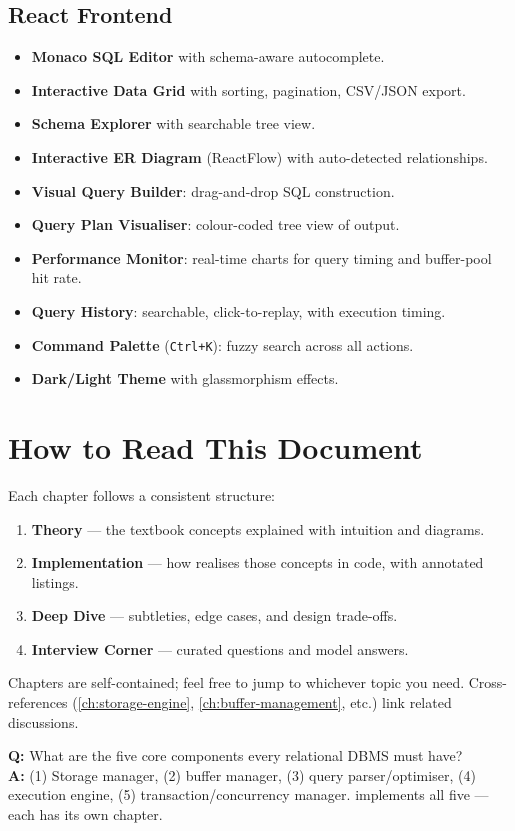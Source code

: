 \subsection{React Frontend}
\begin{itemize}[nosep]
  \item \textbf{Monaco SQL Editor} with schema-aware autocomplete.
  \item \textbf{Interactive Data Grid} with sorting, pagination, CSV/JSON export.
  \item \textbf{Schema Explorer} with searchable tree view.
  \item \textbf{Interactive ER Diagram} (ReactFlow) with auto-detected relationships.
  \item \textbf{Visual Query Builder}: drag-and-drop SQL construction.
  \item \textbf{Query Plan Visualiser}: colour-coded tree view of  output.
  \item \textbf{Performance Monitor}: real-time charts for query timing and buffer-pool hit rate.
  \item \textbf{Query History}: searchable, click-to-replay, with execution timing.
  \item \textbf{Command Palette} (\texttt{Ctrl+K}): fuzzy search across all actions.
  \item \textbf{Dark/Light Theme} with glassmorphism effects.
\end{itemize}

\section{How to Read This Document}

Each chapter follows a consistent structure:
\begin{enumerate}[nosep]
  \item \textbf{Theory} --- the textbook concepts explained with intuition and diagrams.
  \item \textbf{Implementation} --- how \shiftdb{} realises those concepts in code, with annotated listings.
  \item \textbf{Deep Dive} --- subtleties, edge cases, and design trade-offs.
  \item \textbf{Interview Corner} --- curated questions and model answers.
\end{enumerate}

\noindent Chapters are self-contained; feel free to jump to whichever topic you need.  Cross-references (\cref{ch:storage-engine}, \cref{ch:buffer-management}, etc.) link related discussions.

\begin{interviewbox}
\textbf{Q:} What are the five core components every relational DBMS must have?\\[4pt]
\textbf{A:} (1) Storage manager, (2) buffer manager, (3) query parser/optimiser, (4) execution engine, (5) transaction/concurrency manager.  \shiftdb{} implements all five --- each has its own chapter.
\end{interviewbox}

